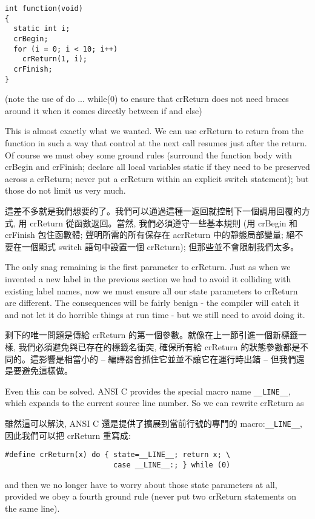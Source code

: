 \documentclass[12pt]{article}
\begin{document}
\begin{CJK}{UTF8}{bsmi}
\begin{lstlisting}[basicstyle=\footnotesize, breaklines=true]
int function(void) 
{
  static int i;
  crBegin;
  for (i = 0; i < 10; i++)
    crReturn(1, i);
  crFinish;
}
\end{lstlisting}

(note the use of do ... while(0) to ensure that crReturn does not need braces around it when it comes directly between if and else)

This is almost exactly what we wanted. We can use crReturn to return from the function in such a way that control at the next call resumes just after the return. Of course we must obey some ground rules (surround the function body with crBegin and crFinish; declare all local variables static if they need to be preserved across a crReturn; never put a crReturn within an explicit switch statement); but those do not limit us very much.

這差不多就是我們想要的了。我們可以通過這種一返回就控制下一個調用回覆的方式, 用 crReturn
從函數返回。當然, 我們必須遵守一些基本規則 (用 crBegin 和 crFinish 包住函數體; 聲明所需的所有保存在
acrReturn 中的靜態局部變量; 絕不要在一個顯式 switch 語句中設置一個 crReturn); 但那些並不會限制我們太多。

The only snag remaining is the first parameter to crReturn. Just as when we invented a new label in the previous section we had to avoid it colliding with existing label names, now we must ensure all our state parameters to crReturn are different. The consequences will be fairly benign - the compiler will catch it and not let it do horrible things at run time - but we still need to avoid doing it.

剩下的唯一問題是傳給 crReturn 的第一個參數。就像在上一節引進一個新標籤一樣, 我們必須避免與已存在的標籤名衝突, 確保所有給 crReturn 的狀態參數都是不同的。這影響是相當小的 -- 編譯器會抓住它並並不讓它在運行時出錯 -- 但我們還是要避免這樣做。

Even this can be solved. ANSI C provides the special macro name \verb+__LINE__+, which expands to the current source line number. So we can rewrite crReturn as

雖然這可以解決, ANSI C 還是提供了擴展到當前行號的專門的 macro:\verb+__LINE__+, 因此我們可以把 crReturn 重寫成:

\begin{lstlisting}[basicstyle=\footnotesize, breaklines=true]
#define crReturn(x) do { state=__LINE__; return x; \
                         case __LINE__:; } while (0)
\end{lstlisting}

and then we no longer have to worry about those state parameters at all, provided we obey a fourth ground rule (never put two crReturn statements on the same line).


\end{CJK}
\end{document}
